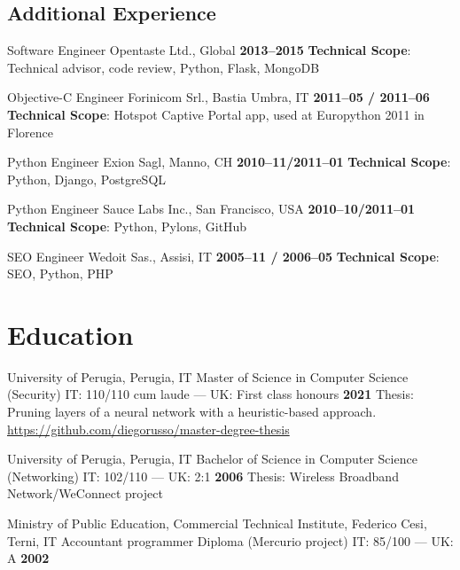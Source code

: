 \documentclass[10pt,a4paper,sans]{moderncv}
\begin{document}
\subsection{Additional Experience}

    {Software Engineer}
    {Opentaste Ltd., Global}
    {\textbf{2013--2015}}
    {\textbf{Technical Scope}: Technical advisor, code review, Python, Flask,
    MongoDB}
    {}

    {Objective-C Engineer}
    {Forinicom Srl., Bastia Umbra, IT}
    {\textbf{2011--05 / 2011--06}}
    {\textbf{Technical Scope}: Hotspot Captive Portal app, used at Europython
    2011 in Florence}
    {}

    {Python Engineer}
    {Exion Sagl, Manno, CH}
    {\textbf{2010--11/2011--01}}
    {\textbf{Technical Scope}: Python, Django, PostgreSQL}
    {}

    {Python Engineer}
    {Sauce Labs Inc., San Francisco, USA}
    {\textbf{2010--10/2011--01}}
    {\textbf{Technical Scope}: Python, Pylons, GitHub}
    {}

    {SEO Engineer}
    {Wedoit Sas., Assisi, IT}
    {\textbf{2005--11 / 2006--05}}
    {\textbf{Technical Scope}: SEO, Python, PHP}
    {}

\section{Education}

\cventry{}
    {University of Perugia, Perugia, IT}
    {Master of Science in Computer Science (Security) IT\@: 110/110 cum laude
        --- UK\@: First class honours}
    {\textbf{2021}}
    {}
    {Thesis: Pruning layers of a neural network with a heuristic-based
        approach. \url{https://github.com/diegorusso/master-degree-thesis}}

\cventry{}
    {University of Perugia, Perugia, IT}
    {Bachelor of Science in Computer Science (Networking) IT\@: 102/110 ---
        UK\@: 2:1}
    {\textbf{2006}}
    {}
    {Thesis: Wireless Broadband Network/WeConnect project}

\cventry{}
    {Ministry of Public Education, Commercial Technical Institute, Federico
        Cesi, Terni, IT}
    {Accountant programmer Diploma (Mercurio project) IT\@: 85/100 --- UK\@: A}
    {\textbf{2002}}
    {}
    {}
\end{document}
